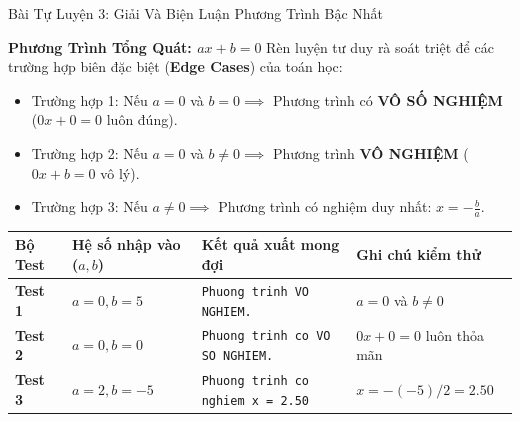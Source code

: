 \documentclass[aspectratio=169, 10pt]{beamer}
\begin{document}
\begin{frame}{Bài Tự Luyện 3: Giải Và Biện Luận Phương Trình Bậc Nhất}
  \begin{block}{\textbf{Phương Trình Tổng Quát: $ax + b = 0$}}
    Rèn luyện tư duy rà soát triệt để các trường hợp biên đặc biệt (\textbf{Edge Cases}) của toán học:
    \begin{itemize}
      \item Trường hợp 1: Nếu $a = 0$ và $b = 0 \implies$ Phương trình có \textbf{VÔ SỐ NGHIỆM} ($0x + 0 = 0$ luôn đúng).
      \item Trường hợp 2: Nếu $a = 0$ và $b \neq 0 \implies$ Phương trình \textbf{VÔ NGHIỆM} ($0x + b = 0$ vô lý).
      \item Trường hợp 3: Nếu $a \neq 0 \implies$ Phương trình có nghiệm duy nhất: $x = -\frac{b}{a}$.
    \end{itemize}
  \end{block}
  \begin{table}[h]
    \centering
    \small
    \begin{tabularx}{0.9\textwidth}{lXXX}
      \toprule
      \textbf{Bộ Test} & \textbf{Hệ số nhập vào ($a, b$)} & \textbf{Kết quả xuất mong đợi} & \textbf{Ghi chú kiểm thử} \\
      \midrule
      \textbf{Test 1} & $a = 0, b = 5$ & \texttt{Phuong trinh VO NGHIEM.} & $a = 0$ và $b \neq 0$ \\
      \addlinespace
      \textbf{Test 2} & $a = 0, b = 0$ & \texttt{Phuong trinh co VO SO NGHIEM.} & $0x + 0 = 0$ luôn thỏa mãn \\
      \addlinespace
      \textbf{Test 3} & $a = 2, b = -5$ & \texttt{Phuong trinh co nghiem x = 2.50} & $x = -(-5) / 2 = 2.50$ \\
      \bottomrule
    \end{tabularx}
  \end{table}
\end{frame}
\end{document}
